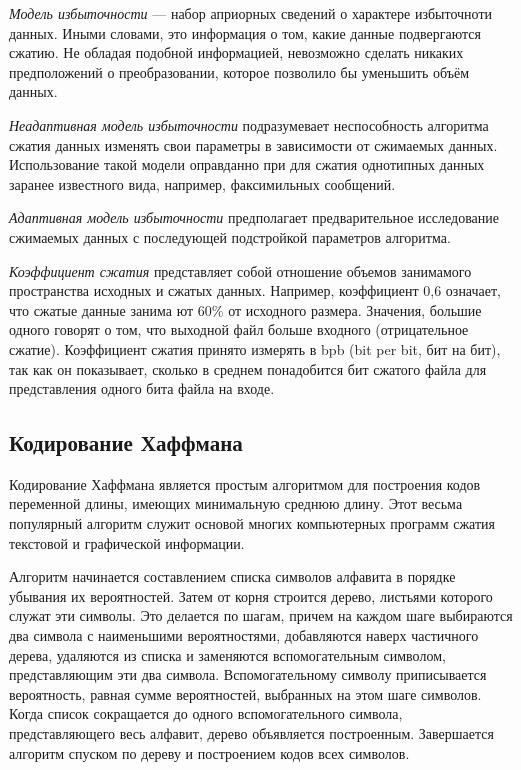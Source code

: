 \textit{Модель избыточности} --- набор априорных сведений о характере
избыточноти данных. Иными словами, это информация о том, какие данные
подвергаются сжатию. Не обладая подобной информацией, 
невозможно сделать никаких предположений о преобразовании, 
которое позволило бы уменьшить объём данных.

\textit{Неадаптивная модель избыточности} подразумевает неспособность 
алгоритма сжатия данных изменять свои параметры в зависимости 
от сжимаемых данных. Использование такой модели оправданно 
при для сжатия однотипных данных заранее известного вида, 
например, факсимильных сообщений.

\textit{Адаптивная модель избыточности} предполагает предварительное 
исследование сжимаемых данных с последующей подстройкой параметров алгоритма.

\textit{Коэффициент сжатия} представляет собой отношение объемов
занимамого пространства исходных и сжатых данных.
Например, коэффициент 0{,}6 означает, что сжатые данные занима­
ют 60\% от исходного размера. Значения, большие одного говорят о том,
что выходной файл больше входного (отрицательное сжатие).
Коэффициент сжатия принято измерять в bpb (bit per bit, бит на бит),
так как он показывает, сколько в среднем понадобится бит сжатого файла
для представления одного бита файла на входе. 






\subsection{Кодирование Хаффмана}

Кодирование Хаффмана является простым алгоритмом для построения
кодов переменной длины, имеющих минимальную среднюю длину.
Этот весьма популярный алгоритм служит основой многих компьютерных программ
сжатия текстовой и графической информации.

Алгоритм начинается составлением списка символов алфавита в
порядке убывания их вероятностей. Затем от корня строится дерево,
листьями которого служат эти символы. Это делается по шагам,
причем на каждом шаге выбираются два символа с наименьшими
вероятностями, добавляются наверх частичного дерева, удаляются
из списка и заменяются вспомогательным символом, представляющим
эти два символа. Вспомогательному символу приписывается
вероятность, равная сумме вероятностей, выбранных на этом 
шаге символов. Когда список сокращается до одного вспомогательного символа,
представляющего весь алфавит, дерево объявляется
построенным.
Завершается алгоритм спуском по дереву и построением кодов всех символов.

